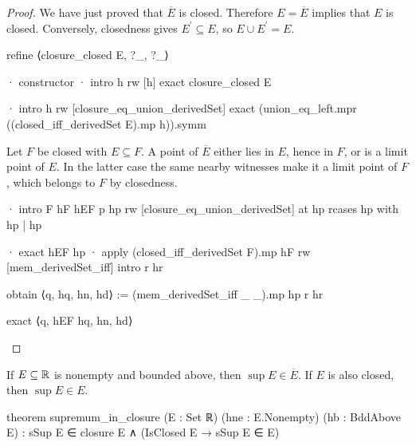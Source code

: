 \begin{proof}
  We have just proved that $\overline E$ is closed.
  Therefore $E=\overline E$ implies that $E$ is closed.
  Conversely, closedness gives $E^{\prime}\subseteq E$, so $E\cup E^{\prime}=E$.

  \begin{lean}
    refine ⟨closure_closed E, ?_, ?_⟩

    · constructor
      · intro h
        rw [h]
        exact closure_closed E

      · intro h
        rw [closure_eq_union_derivedSet]
        exact (union_eq_left.mpr ((closed_iff_derivedSet E).mp h)).symm
  \end{lean}

  Let $F$ be closed with $E\subseteq F$.
  A point of $\overline E$ either lies in $E$, hence in $F$, or is a limit point of $E$.
  In the latter case the same nearby witnesses make it a limit point of $F$, which belongs to $F$
  by closedness.

  \begin{lean}
    · intro F hF hEF p hp
      rw [closure_eq_union_derivedSet] at hp
      rcases hp with hp | hp

      · exact hEF hp
      · apply (closed_iff_derivedSet F).mp hF
        rw [mem_derivedSet_iff]
        intro r hr

        obtain ⟨q, hq, hn, hd⟩ := (mem_derivedSet_iff _ _).mp hp r hr

        exact ⟨q, hEF hq, hn, hd⟩
  \end{lean}

\end{proof}

\begin{proposition}
  \label{an1:thm:supremum-in-closure}
  If $E\subseteq\mathbb{R}$ is nonempty and bounded above, then $\sup E\in\overline E$.
  If $E$ is also closed, then $\sup E\in E$.

  \begin{lean}
    theorem supremum_in_closure (E : Set ℝ) (hne : E.Nonempty) (hb : BddAbove E) :
        sSup E ∈ closure E ∧ (IsClosed E → sSup E ∈ E)
  \end{lean}
\end{proposition}

